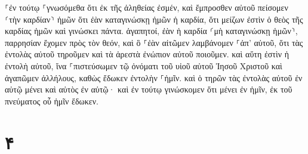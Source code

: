 \documentclass{openreader}
\begin{document}
⸀ἐν τούτῳ ⸀γνωσόμεθα ὅτι ἐκ τῆς ἀληθείας ἐσμέν, καὶ ἔμπροσθεν αὐτοῦ πείσομεν ⸂τὴν καρδίαν⸃ ἡμῶν ὅτι ἐὰν καταγινώσκῃ ἡμῶν ἡ καρδία, ὅτι μείζων ἐστὶν ὁ θεὸς τῆς καρδίας ἡμῶν καὶ γινώσκει πάντα. ἀγαπητοί, ἐὰν ἡ καρδία ⸂μὴ καταγινώσκῃ ἡμῶν⸃, παρρησίαν ἔχομεν πρὸς τὸν θεόν, καὶ ὃ ⸀ἐὰν αἰτῶμεν λαμβάνομεν ⸀ἀπ’ αὐτοῦ, ὅτι τὰς ἐντολὰς αὐτοῦ τηροῦμεν καὶ τὰ ἀρεστὰ ἐνώπιον αὐτοῦ ποιοῦμεν. καὶ αὕτη ἐστὶν ἡ ἐντολὴ αὐτοῦ, ἵνα ⸀πιστεύσωμεν τῷ ὀνόματι τοῦ υἱοῦ αὐτοῦ Ἰησοῦ Χριστοῦ καὶ ἀγαπῶμεν ἀλλήλους, καθὼς ἔδωκεν ἐντολὴν ⸀ἡμῖν. καὶ ὁ τηρῶν τὰς ἐντολὰς αὐτοῦ ἐν αὐτῷ μένει καὶ αὐτὸς ἐν αὐτῷ· καὶ ἐν τούτῳ γινώσκομεν ὅτι μένει ἐν ἡμῖν, ἐκ τοῦ πνεύματος οὗ ἡμῖν ἔδωκεν. \section*{۴}
\end{document}
